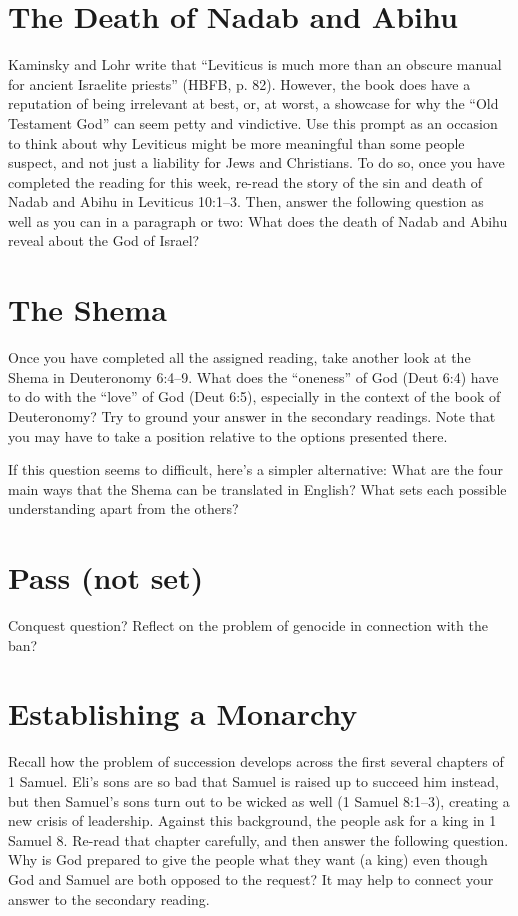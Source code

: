 \documentclass[12pt]{article}
\begin{document}
\section{The Death of Nadab and Abihu}

Kaminsky and Lohr write that “Leviticus is much more than an obscure manual for ancient Israelite priests” (HBFB, p. 82). However, the book does have a reputation of being irrelevant at best, or, at worst, a showcase for why the “Old Testament God” can seem petty and vindictive. Use this prompt as an occasion to think about why Leviticus might be more meaningful than some people suspect, and not just a liability for Jews and Christians. To do so, once you have completed the reading for this week, re-read the story of the sin and death of Nadab and Abihu in Leviticus 10:1–3. Then, answer the following question as well as you can in a paragraph or two: What does the death of Nadab and Abihu reveal about the God of Israel?


\section{The Shema}

Once you have completed all the assigned reading, take another look at the Shema in Deuteronomy 6:4–9. What does the “oneness” of God (Deut 6:4) have to do with the “love” of God (Deut 6:5), especially in the context of the book of Deuteronomy? Try to ground your answer in the secondary readings. Note that you may have to take a position relative to the options presented there.

If this question seems to difficult, here's a simpler alternative: What are the four main ways that the Shema can be translated in English? What sets each possible understanding apart from the others?

\section{Pass (not set)}

Conquest question? Reflect on the problem of genocide in connection with the ban?

\section{Establishing a Monarchy}

Recall how the problem of succession develops across the first several chapters of 1 Samuel. Eli’s sons are so bad that Samuel is raised up to succeed him instead, but then Samuel’s sons turn out to be wicked as well (1 Samuel 8:1–3), creating a new crisis of leadership. Against this background, the people ask for a king in 1 Samuel 8. Re-read that chapter carefully, and then answer the following question. Why is God prepared to give the people what they want (a king) even though God and Samuel are both opposed to the request? It may help to connect your answer to the secondary reading.
\end{document}

